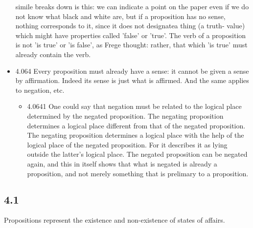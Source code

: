 \documentclass[11pt]{article}
\begin{document}
\begin{itemize}
simile breaks down is this: we can indicate a point on the paper even if we
do not know what black and white are, but if a proposition has no sense,
nothing corresponds to it, since it does not designatea thing (a truth-
value) which might have properties called 'false' or 'true'. The verb of a
proposition is not 'is true' or 'is false', as Frege thought: rather, that
which 'is true' must already contain the verb.
\item 4.064
\label{sec:org2016ca9}
Every proposition must already have a sense: it cannot be given a
sense by affirmation. Indeed its sense is just what is affirmed. And the
same applies to negation, etc.
\begin{itemize}
\item 4.0641
\label{sec:org81e8df2}
One could say that negation must be related to the logical place
determined by the negated proposition. The negating proposition determines
a logical place different from that of the negated proposition. The
negating proposition determines a logical place with the help of the
logical place of the negated proposition. For it describes it as lying
outside the latter's logical place. The negated proposition can be negated
again, and this in itself shows that what is negated is already a
proposition, and not merely something that is prelimary to a proposition.
\end{itemize}
\end{itemize}
\subsection*{4.1}
\label{sec:org319515b}
Propositions represent the existence and non-existence of states of
affairs.
\end{document}
